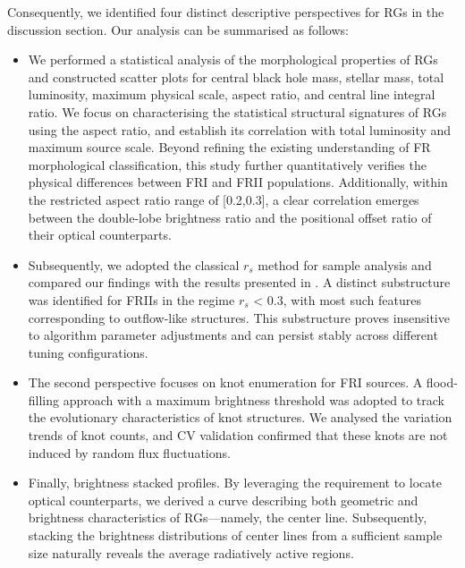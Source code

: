 \documentclass{aa}
\begin{document}
Consequently, we identified four distinct descriptive perspectives for RGs in the discussion section. Our analysis can be summarised as follows:

\begin{itemize}[label=$\star$]

    \item We performed a statistical analysis of the morphological properties of RGs and constructed scatter plots for central black hole mass, stellar mass, total luminosity, maximum physical scale, aspect ratio, and central line integral ratio. We focus on characterising the statistical structural signatures of RGs using the aspect ratio, and establish its correlation with total luminosity and maximum source scale. Beyond refining the existing understanding of FR morphological classification, this study further quantitatively verifies the physical differences between FRI and FRII populations. 
    Additionally, within the restricted aspect ratio range of [0.2,0.3], a clear correlation emerges between the double-lobe brightness ratio and the positional offset ratio of their optical counterparts.

    \item Subsequently, we adopted the classical $r_s$ method for sample analysis and compared our findings with the results presented in \citet{lin_populations_2010}. A distinct substructure was identified for FRIIs in the regime $r_s$ < 0.3, with most such features corresponding to outflow-like structures. This substructure proves insensitive to algorithm parameter adjustments and can persist stably across different tuning configurations.

    \item The second perspective focuses on knot enumeration for FRI sources. A flood-filling approach with a maximum brightness threshold was adopted to track the evolutionary characteristics of knot structures. We analysed the variation trends of knot counts, and CV validation confirmed that these knots are not induced by random flux fluctuations.
    
    \item Finally, brightness stacked profiles. By leveraging the requirement to locate optical counterparts, we derived a curve describing both geometric and brightness characteristics of RGs—namely, the center line. Subsequently, stacking the brightness distributions of center lines from a sufficient sample size naturally reveals the average radiatively active regions.
    
\end{itemize}
\end{document}

